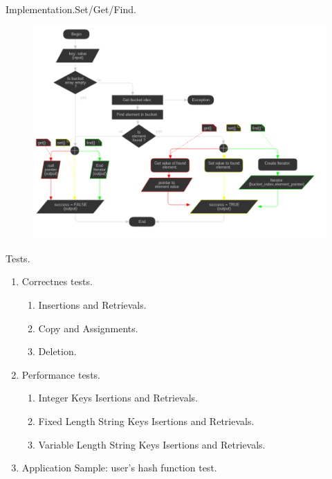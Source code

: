 \documentclass{beamer}
\begin{document}
\begin{frame}{Implementation.}{Set/Get/Find.}
  \begin{figure}
    \includegraphics[scale=0.3]{pictures/implementation_set_get_find_flowchart}
  \end{figure}
\end{frame}

\begin{frame}{Tests.}
  \begin{enumerate}
  \item Correctnes tests.
    \begin{enumerate}
    \item Insertions and Retrievals.
    \item Copy and Assignments.
    \item Deletion.
    \end{enumerate}
  \item Performance tests.
    \begin{enumerate}
    \item Integer Keys Isertions and Retrievals.
    \item Fixed Length String Keys Isertions and Retrievals.
    \item Variable Length String Keys Isertions and Retrievals.
    \end{enumerate}
  \item Application Sample: user's hash function test.
  \end{enumerate}
\end{frame}
\end{document}
